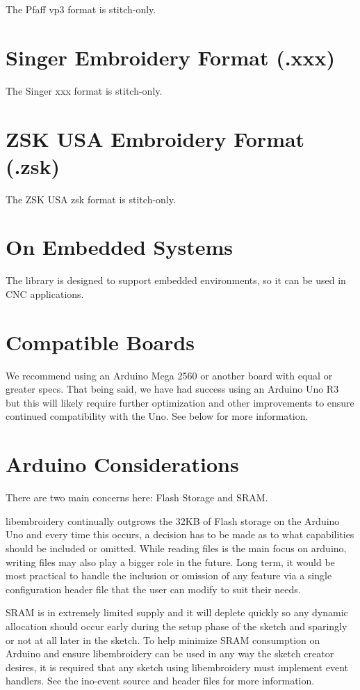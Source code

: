 \documentclass{report}
\begin{document}
The Pfaff vp3 format is stitch-only.

\section{Singer Embroidery Format (.xxx)}

The Singer xxx format is stitch-only.

\section{ZSK USA Embroidery Format (.zsk)}

The ZSK USA zsk format is stitch-only.
  
\section{On Embedded Systems}

The library is designed to support embedded environments, so it can
be used in CNC applications.

\section{Compatible Boards}

We recommend using an Arduino Mega 2560 or another board with equal or
greater specs. That being said, we have had success using an Arduino Uno
R3 but this will likely require further optimization and other
improvements to ensure continued compatibility with the Uno. See below
for more information.

\section{Arduino Considerations}

There are two main concerns here: Flash Storage and SRAM.

libembroidery continually outgrows the 32KB of Flash storage on the Arduino Uno and every time this occurs, a decision has to be made as to what capabilities should be included or omitted. While reading files is the main focus on arduino, writing files may also play a bigger role in the future. Long term, it would be most practical to handle the inclusion or omission of any feature via a single configuration header file that the user can modify to suit their needs.

SRAM is in extremely limited supply and it will deplete quickly so any dynamic allocation should occur early during the setup phase of the sketch and sparingly or not at all later in the sketch. To help minimize SRAM consumption on Arduino and ensure libembroidery can be used in any way the sketch creator desires, it is required that any sketch using libembroidery must implement event handlers. See the ino-event source and header files for more information.
\end{document}
